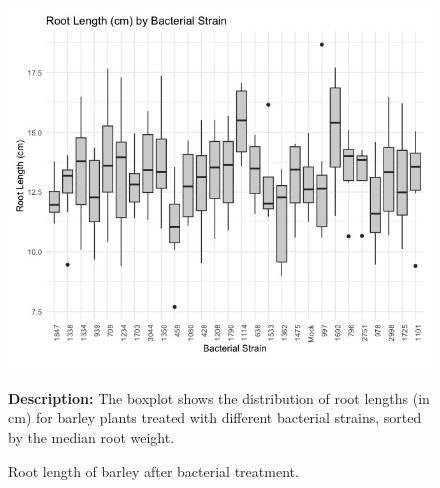 \begin{figure}[!ht]
    \centering
    \raggedright
    \includegraphics[width=\linewidth]{Figures/RootLength.jpeg}
    \caption{Root length of barley after bacterial treatment.}
    \medskip
    \textbf{Description:} The boxplot shows the distribution of root lengths (in cm) for barley plants treated with different bacterial strains, sorted by the median root weight.
    \label{fig:root_length_boxplot}
\end{figure}

